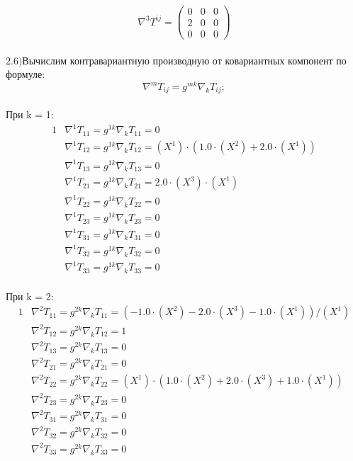 \documentclass[a4paper, 12pt, oneside]{article}
\begin{document}
\[
\nabla^3T^{ij} = \begin{pmatrix}
	0 & 0 & 0\\
	2 & 0 & 0\\
	0 & 0 & 0
\end{pmatrix}
\]\\
$\mathrm{2.6) }$Вычислим контравариантную производную от ковариантных компонент по формуле:\\
\[
\nabla^mT_{ij} = g^{mk}\nabla_kT_{ij};
\]\\
При k = 1:\\
\begin{alignat*}{1}
  & \nabla^1T_{11} = g^{1k}\nabla_kT_{11} = 0 \\
  & \nabla^1T_{12} = g^{1k}\nabla_kT_{12} = (X^1)\cdot (1.0\cdot (X^2) + 2.0\cdot (X^1)) \\
  & \nabla^1T_{13} = g^{1k}\nabla_kT_{13} = 0 \\
  & \nabla^1T_{21} = g^{1k}\nabla_kT_{21} = 2.0\cdot (X^3)\cdot (X^1) \\
  & \nabla^1T_{22} = g^{1k}\nabla_kT_{22} = 0 \\
  & \nabla^1T_{23} = g^{1k}\nabla_kT_{23} = 0 \\
  & \nabla^1T_{31} = g^{1k}\nabla_kT_{31} = 0 \\
  & \nabla^1T_{32} = g^{1k}\nabla_kT_{32} = 0 \\
  & \nabla^1T_{33} = g^{1k}\nabla_kT_{33} = 0 
\end{alignat*}\\
При k = 2:\\
\begin{alignat*}{1}
  & \nabla^2T_{11} = g^{2k}\nabla_kT_{11} = (-1.0\cdot (X^2) - 2.0\cdot (X^3) - 1.0\cdot (X^1))/(X^1) \\
  & \nabla^2T_{12} = g^{2k}\nabla_kT_{12} = 1 \\
  & \nabla^2T_{13} = g^{2k}\nabla_kT_{13} = 0 \\
  & \nabla^2T_{21} = g^{2k}\nabla_kT_{21} = 0 \\
  & \nabla^2T_{22} = g^{2k}\nabla_kT_{22} = (X^1)\cdot (1.0\cdot (X^2) + 2.0\cdot (X^3) + 1.0\cdot (X^1)) \\
  & \nabla^2T_{23} = g^{2k}\nabla_kT_{23} = 0 \\
  & \nabla^2T_{31} = g^{2k}\nabla_kT_{31} = 0 \\
  & \nabla^2T_{32} = g^{2k}\nabla_kT_{32} = 0 \\
  & \nabla^2T_{33} = g^{2k}\nabla_kT_{33} = 0 
\end{alignat*}\\
\end{document}
